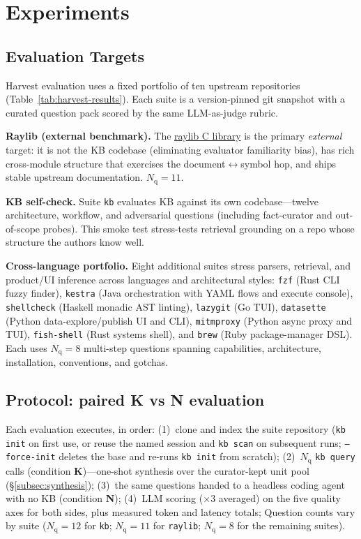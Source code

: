 \section{Experiments}
\label{sec:experiments}

\subsection{Evaluation Targets}

Harvest evaluation uses a fixed portfolio of ten upstream repositories
(Table~\ref{tab:harvest-results}).  Each suite is a version-pinned git snapshot
with a curated question pack scored by the same LLM-as-judge rubric.

\medskip
\noindent\textbf{Raylib (external benchmark).}  The
\href{https://github.com/raysan5/raylib}{raylib C library} is the primary
\emph{external} target: it is not the KB codebase (eliminating evaluator familiarity
bias), has rich cross-module structure that exercises the document$\leftrightarrow$symbol
hop, and ships stable upstream documentation.  $N_{\text{q}} = 11$.

\medskip
\noindent\textbf{KB self-check.}  Suite \texttt{kb} evaluates KB against its
own codebase---twelve architecture, workflow, and adversarial questions (including
fact-curator and out-of-scope probes).  This smoke test stress-tests retrieval
grounding on a repo whose structure the authors know well.

\medskip
\noindent\textbf{Cross-language portfolio.}  Eight additional suites stress parsers,
retrieval, and product/UI inference across languages and architectural styles:
\texttt{fzf} (Rust CLI fuzzy finder),
\texttt{kestra} (Java orchestration with YAML flows and execute console),
\texttt{shellcheck} (Haskell monadic AST linting),
\texttt{lazygit} (Go TUI),
\texttt{datasette} (Python data-explore/publish UI and CLI),
\texttt{mitmproxy} (Python async proxy and TUI),
\texttt{fish-shell} (Rust systems shell), and
\texttt{brew} (Ruby package-manager DSL).
Each uses $N_{\text{q}} = 8$ multi-step questions spanning capabilities,
architecture, installation, conventions, and gotchas.

\subsection{Protocol: paired K vs N evaluation}

Each evaluation executes, in order:
(1)~clone and index the suite repository (\texttt{kb init} on first use, or reuse
the named session and \texttt{kb scan} on subsequent runs; \texttt{--force-init}
deletes the base and re-runs \texttt{kb init} from scratch);
(2)~$N_{\text{q}}$ \texttt{kb query} calls (condition \textbf{K})---one-shot synthesis
over the curator-kept unit pool (\S\ref{subsec:synthesis});
(3)~the same questions handed to a headless coding agent with no KB
(condition \textbf{N});
(4)~LLM scoring ($\times 3$ averaged) on the five quality axes for both sides,
plus measured token and latency totals;
Question counts vary by suite ($N_{\text{q}} = 12$ for \texttt{kb};
$N_{\text{q}} = 11$ for \texttt{raylib}; $N_{\text{q}} = 8$ for the remaining
suites).


